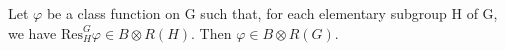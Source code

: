 Let $\varphi$ be a class function on G such that, for each elementary subgroup H of G, we have $\text{Res}_H^G \varphi \in B \otimes R(H)$. Then $\varphi \in B \otimes R(G)$.
